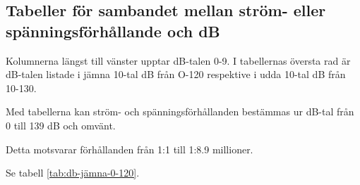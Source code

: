 \begin{rev-raderas}
\section{Tabeller för sambandet mellan ström- eller spänningsförhållande
  och dB}

Kolumnerna längst till vänster upptar dB-talen 0-9. I tabellernas
översta rad är dB-talen listade i jämna 10-tal dB från O-120
respektive i udda 10-tal dB från 10-130.

Med tabellerna kan ström- och spänningsförhållanden bestämmas ur
dB-tal från 0 till 139 dB och omvänt.

Detta motsvarar förhållanden från 1:1 till 1:8.9 millioner.

Se tabell \ref{tab:db-jämna-0-120}.

\end{rev-raderas}
